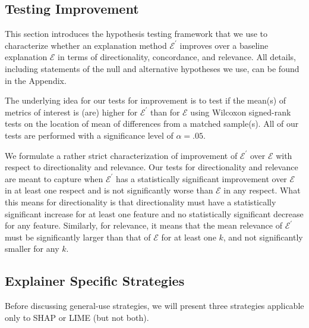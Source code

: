 \documentclass[12pt]{article}  %
\newcommand{\mE}{\mathcal{E}}
\begin{document}
    \subsection{Testing Improvement}
        \label{sec:improvement}
        This section introduces the hypothesis testing framework that we use to characterize whether an explanation method $\mE^\prime$ improves over a baseline explanation $\mE$ in terms of directionality, concordance, and relevance. All details, including statements of the null and alternative hypotheses we use, can be found in the Appendix.
        
        
        The underlying idea for our tests for improvement is to test if the mean(s) of metrics of interest is (are) higher for $\mE^\prime$ than for $\mE$ using Wilcoxon signed-rank tests on the location of mean of differences from a matched sample(s).
        All of our tests are performed with a significance level of $\alpha=.05$. 
        
        We formulate a rather strict characterization of improvement of $\mE^\prime$ over $\mE$ with respect to directionality and relevance. Our tests for directionality and relevance are meant to capture when $\mE^\prime$ has a statistically significant improvement over $\mE$ in at least one respect and is not significantly worse than $\mE$ in any respect. What this means for directionality is that directionality must have a statistically significant increase for at least one feature and no statistically significant decrease for any feature. Similarly, for relevance, it means that the mean relevance of $\mE^\prime$ must be significantly larger than that of $\mE$ for at least one $k$, and not significantly smaller for any $k$. 
        
        
     


    \subsection{Explainer Specific Strategies}
        Before discussing general-use strategies, we will present three strategies applicable only to SHAP or LIME (but not both). 
\end{document}
